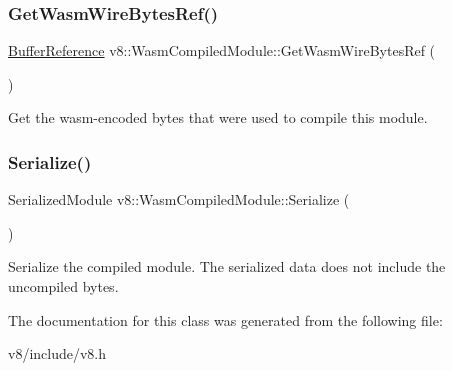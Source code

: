 \subsubsection{\texorpdfstring{Get\+Wasm\+Wire\+Bytes\+Ref()}{GetWasmWireBytesRef()}}
{\footnotesize\ttfamily \mbox{\hyperlink{structv8_1_1WasmCompiledModule_1_1BufferReference}{Buffer\+Reference}} v8\+::\+Wasm\+Compiled\+Module\+::\+Get\+Wasm\+Wire\+Bytes\+Ref (\begin{DoxyParamCaption}{ }\end{DoxyParamCaption})}

Get the wasm-\/encoded bytes that were used to compile this module. \mbox{\label{classv8_1_1WasmCompiledModule_a56ba174cfc319056ecdfc870e6c9d832}} 
\subsubsection{\texorpdfstring{Serialize()}{Serialize()}}
{\footnotesize\ttfamily Serialized\+Module v8\+::\+Wasm\+Compiled\+Module\+::\+Serialize (\begin{DoxyParamCaption}{ }\end{DoxyParamCaption})}

Serialize the compiled module. The serialized data does not include the uncompiled bytes. 

The documentation for this class was generated from the following file\+:\begin{DoxyCompactItemize}
\item 
v8/include/v8.\+h\end{DoxyCompactItemize}
